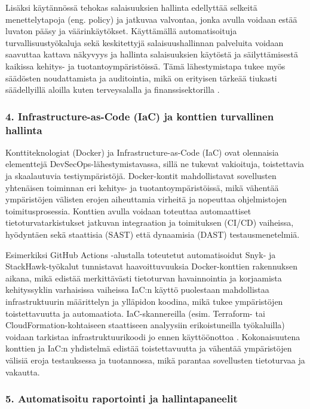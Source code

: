 \documentclass[bscthesis,finnish,oneside,biblatex]{uefcsthesis}
\begin{document}
    Lisäksi käytännössä tehokas salaisuuksien hallinta edellyttää selkeitä menettelytapoja (eng. policy) ja jatkuvaa valvontaa, jonka avulla voidaan estää luvaton pääsy ja väärinkäytökset. Käyttämällä automatisoituja turvallisuustyökaluja sekä keskitettyjä salaisuushallinnan palveluita voidaan saavuttaa kattava näkyvyys ja hallinta salaisuuksien käytöstä ja säilyttämisestä kaikissa kehitys- ja tuotantoympäristöissä. Tämä lähestymistapa tukee myös säädösten noudattamista ja auditointia, mikä on erityisen tärkeää tiukasti säädellyillä aloilla kuten terveysalalla ja finanssisektorilla \cite{byman2024continuous}.

    \subsubsection{4. Infrastructure-as-Code (IaC) ja konttien turvallinen hallinta}

    Konttiteknologiat (Docker) ja Infrastructure-as-Code (IaC) ovat olennaisia elementtejä DevSecOps-lähestymistavassa, sillä ne tukevat vakioituja, toistettavia ja skaalautuvia testiympäristöjä. Docker-kontit mahdollistavat sovellusten yhtenäisen toiminnan eri kehitys- ja tuotantoympäristöissä, mikä vähentää ympäristöjen välisten erojen aiheuttamia virheitä ja nopeuttaa ohjelmistojen toimitusprosessia. Konttien avulla voidaan toteuttaa automaattiset tietoturvatarkistukset jatkuvan integraation ja toimituksen (CI/CD) vaiheissa, hyödyntäen sekä staattisia (SAST) että dynaamisia (DAST) testausmenetelmiä. \cite{marandi2023_ias,putra2022_devsecops,feio2024_empirical}

    Esimerkiksi GitHub Actions -alustalla toteutetut automatisoidut Snyk- ja StackHawk-työkalut tunnistavat haavoittuvuuksia Docker-konttien rakennuksen aikana, mikä edistää merkittävästi tietoturvan havainnointia ja korjaamista kehityssyklin varhaisissa vaiheissa \cite{marandi2023_ias}IaC:n käyttö puolestaan mahdollistaa infrastruktuurin määrittelyn ja ylläpidon koodina, mikä tukee ympäristöjen toistettavuutta ja automaatiota. IaC-skannereilla (esim. Terraform- tai CloudFormation-kohtaiseen staattiseen analyysiin erikoistuneilla työkaluilla) voidaan tarkistaa infrastruktuurikoodi jo ennen käyttöönottoa \cite{marandi2023_ias}. Kokonaisuutena konttien ja IaC:n yhdistelmä edistää toistettavuutta ja vähentää ympäristöjen välisiä eroja testauksessa ja tuotannossa, mikä parantaa sovellusten tietoturvaa ja vakautta.

    \subsubsection{5. Automatisoitu raportointi ja hallintapaneelit}
\end{document}
